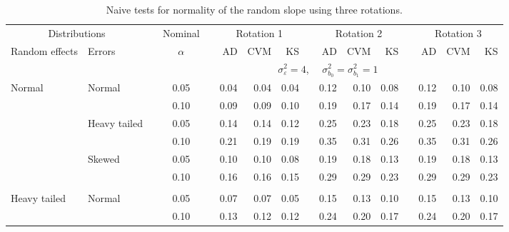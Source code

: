 \documentclass[12pt]{article} %
\begin{document}
\begin{table}[ht]
\begin{scriptsize}
\begin{center}
\begin{tabular}{ll p{.1cm} c p{.1cm} rrr p{.1cm} rrr p{.1cm} rrr}
   \hline
\end{tabular}
\end{center}
\end{scriptsize}
\end{table}



\begin{table}[ht]
\caption{Naive tests for normality of the random slope using three rotations.}
\begin{scriptsize}
\begin{center}
\begin{tabular}{ll p{.1cm} c p{.1cm} rrr p{.1cm} rrr p{.1cm} rrr}
  \hline
  \multicolumn{2}{c}{Distributions}& & Nominal & &  \multicolumn{3}{c}{Rotation 1} & & \multicolumn{3}{c}{Rotation 2} & & \multicolumn{3}{c}{Rotation 3}\\ \cline{1-2} \cline{6-8} \cline{10-12} \cline{14-16}
  Random effects & Errors & & $\alpha$ & & AD & CVM & KS & & AD & CVM & KS & & AD & CVM & KS \\ 
   \hline
& && && \multicolumn{9}{c}{$\sigma_{\varepsilon}^2 = 4$, \ \ $\sigma_{b_0}^2 = \sigma_{b_1}^2 = 1$} \\ \cline{6-16}
\rowcolor{gray!20}Normal       & Normal       && 0.05 &&   0.04 & 0.04 & 0.04 && 0.12 & 0.10 & 0.08 && 0.12 & 0.10 & 0.08 \\ 
\rowcolor{gray!20}             &              && 0.10 &&   0.09 & 0.09 & 0.10 && 0.19 & 0.17 & 0.14 && 0.19 & 0.17 & 0.14 \\ 
\rowcolor{gray!20}             & Heavy tailed && 0.05 &&   0.14 & 0.14 & 0.12 && 0.25 & 0.23 & 0.18 && 0.25 & 0.23 & 0.18 \\ 
\rowcolor{gray!20}             &              && 0.10 &&   0.21 & 0.19 & 0.19 && 0.35 & 0.31 & 0.26 && 0.35 & 0.31 & 0.26 \\ 
\rowcolor{gray!20}             & Skewed       && 0.05 &&   0.10 & 0.10 & 0.08 && 0.19 & 0.18 & 0.13 && 0.19 & 0.18 & 0.13 \\ 
\rowcolor{gray!20}             &              && 0.10 &&   0.16 & 0.16 & 0.15 && 0.29 & 0.29 & 0.23 && 0.29 & 0.29 & 0.23 \\ 
             &&&&&&&&&&&&&&&\\
Heavy tailed & Normal       && 0.05 &&   0.07 & 0.07 & 0.05 && 0.15 & 0.13 & 0.10 && 0.15 & 0.13 & 0.10 \\ 
             &              && 0.10 &&   0.13 & 0.12 & 0.12 && 0.24 & 0.20 & 0.17 && 0.24 & 0.20 & 0.17 \\ 

\end{tabular}
\end{center}
\end{scriptsize}
\end{table}
\end{document}
